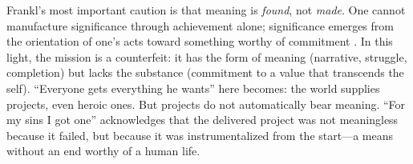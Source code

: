 Frankl's most important caution is that meaning is \emph{found}, not \emph{made}. One cannot 
manufacture significance through achievement alone; significance emerges from the orientation 
of one's acts toward something worthy of commitment \parencite[pp.~115--121]{FranklMeaning2006}. 
In this light, the mission is a counterfeit: it has the form of meaning (narrative, struggle, 
completion) but lacks the substance (commitment to a value that transcends the self). 
``Everyone gets everything he wants'' here becomes: the world supplies projects, even heroic 
ones. But projects do not automatically bear meaning. ``For my sins I got one'' acknowledges 
that the delivered project was not meaningless because it failed, but because it was 
instrumentalized from the start---a means without an end worthy of a human life.

